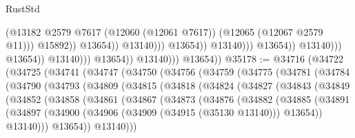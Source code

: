 \begin{lexlean}{RustStd}
\begin{coremodule}
                                                              (@13182
                                                                @2579
                                                                @7617
                                                                (@12060 (@12061 @7617))
                                                                (@12065 (@12067 @2579 @11)))
                                                              @15892))
                                                          @13654))
                                                      @13140)))
                                                @13654))
                                            @13140)))
                                      @13654))
                                  @13140)))
                            @13654))
                        @13140)))
                  @13654))
              @13140)))
        @13654))
@35178 := @34716
    (@34722
      (@34725
        (@34741
          (@34747
            (@34750
              (@34756
                (@34759
                  (@34775
                    (@34781
                      (@34784
                        (@34790
                          (@34793
                            (@34809
                              (@34815
                                (@34818
                                  (@34824
                                    (@34827
                                      (@34843
                                        (@34849
                                          (@34852
                                            (@34858
                                              (@34861
                                                (@34867
                                                  (@34873
                                                    (@34876
                                                      (@34882
                                                        (@34885
                                                          (@34891
                                                            (@34897
                                                              (@34900
                                                                (@34906
                                                                  (@34909 (@34915 (@35130 @13140)))
                                                                  @13654))
                                                              @13140)))
                                                        @13654))
                                                    @13140)))

\end{coremodule}
\end{lexlean}
